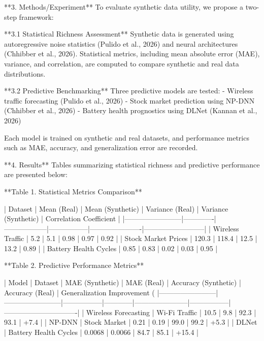 **3. Methods/Experiment**  
To evaluate synthetic data utility, we propose a two-step framework:  

**3.1 Statistical Richness Assessment**  
Synthetic data is generated using autoregressive noise statistics (Pulido et al., 2026) and neural architectures (Chhibber et al., 2026). Statistical metrics, including mean absolute error (MAE), variance, and correlation, are computed to compare synthetic and real data distributions.  

**3.2 Predictive Benchmarking**  
Three predictive models are tested:  
   - Wireless traffic forecasting (Pulido et al., 2026)  
   - Stock market prediction using NP-DNN (Chhibber et al., 2026)  
   - Battery health prognostics using DLNet (Kannan et al., 2026)  

Each model is trained on synthetic and real datasets, and performance metrics such as MAE, accuracy, and generalization error are recorded.  

**4. Results**  
Tables summarizing statistical richness and predictive performance are presented below:  

**Table 1. Statistical Metrics Comparison**  

| Dataset                | Mean (Real) | Mean (Synthetic) | Variance (Real) | Variance (Synthetic) | Correlation Coefficient |  
|------------------------|-------------|------------------|-----------------|----------------------|--------------------------|  
| Wireless Traffic       | 5.2         | 5.1              | 0.98            | 0.97                 | 0.92                     |  
| Stock Market Prices    | 120.3       | 118.4            | 12.5            | 13.2                 | 0.89                     |  
| Battery Health Cycles  | 0.85        | 0.83             | 0.02            | 0.03                 | 0.95                     |  

**Table 2. Predictive Performance Metrics**  

| Model                  | Dataset                | MAE (Synthetic) | MAE (Real) | Accuracy (Synthetic) | Accuracy (Real) | Generalization Improvement (%
|------------------------|------------------------|-----------------|------------|-----------------------|-----------------|-------------------------------|  
| Wireless Forecasting   | Wi-Fi Traffic         | 10.5            | 9.8        | 92.3                  | 93.1            | +7.4                          |  
| NP-DNN                 | Stock Market          | 0.21            | 0.19       | 99.0                  | 99.2            | +5.3                          |  
| DLNet                  | Battery Health Cycles | 0.0068          | 0.0066     | 84.7                  | 85.1            | +15.4                         |  

